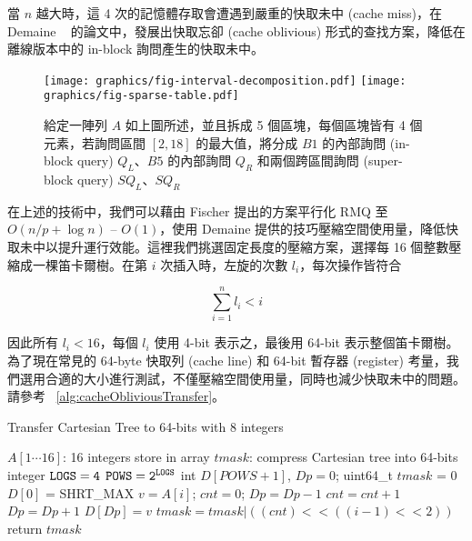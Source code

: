 \documentclass{gapd}
\begin{document}
當 $n$ 越大時，這 4 次的記憶體存取會遭遇到嚴重的快取未中 (cache miss)，在 Demaine ~\cite{demaine} 的論文中，發展出快取忘卻 (cache oblivious) 形式的查找方案，降低在離線版本中的 in-block 詢問產生的快取未中。

\begin{figure*}
  \centering
  \texttt{[image: graphics/fig-interval-decomposition.pdf]}
  \texttt{[image: graphics/fig-sparse-table.pdf]}
  \caption{給定一陣列 $A$ 如上圖所述，並且拆成 5 個區塊，每個區塊皆有 4 個元素，若詢問區間 $[2, 18]$ 的最大值，將分成 $B1$ 的內部詢問 (in-block query) $Q_L$、$B5$ 的內部詢問 $Q_R$ 和兩個跨區間詢問 (super-block query) $SQ_L$、$SQ_R$}
  \label{fig:interval-decomposition}
\end{figure*}

在上述的技術中，我們可以藉由 Fischer 提出的方案平行化 RMQ 至 $O(n / p + \log n)$ -- $O(1)$，使用 Demaine 提供的技巧壓縮空間使用量，降低快取未中以提升運行效能。這裡我們挑選固定長度的壓縮方案，選擇每 16 個整數壓縮成一棵笛卡爾樹。在第 $i$ 次插入時，左旋的次數 $l_i$，每次操作皆符合 

$$\sum_{i=1}^{n} l_i < i$$

因此所有 $l_i < 16$，每個 $l_i$ 使用 4-bit 表示之，最後用 64-bit 表示整個笛卡爾樹。為了現在常見的 64-byte 快取列 (cache line) 和 64-bit 暫存器 (register) 考量，我們選用合適的大小進行測試，不僅壓縮空間使用量，同時也減少快取未中的問題。請參考 ~\ref{alg:cacheObliviousTransfer}。

\begin{algorithm*}
  \caption{Transfer Cartesian Tree to 64-bits with 8 integers}
  \label{alg:cacheObliviousTransfer}
  \begin{algorithmic}[1]
    \Require
      $A[1 \cdots 16]$: 16 integers store in array
    \Ensure 
      $\textit{tmask}$: compress Cartesian tree into 64-bits integer
      \State $\tt{LOGS} = 4$
      \State $\tt{POWS} = 2^{\tt{LOGS}}$
      \State int $D[POWS+1]$, $Dp = 0$;
      \State uint64\_t $tmask$ = $0$
      \State $D[0]$ = SHRT\_MAX
        \State $v = A[i]$;
        \State $cnt = 0$;
          \State $Dp = Dp-1$
          \State $cnt = cnt + 1$
        \EndWhile
        \State $Dp = Dp+1$
        \State $D[Dp] = v$
        \State $tmask = tmask | ((cnt)<<((i-1)<<2))$
      \EndFor
      \State return $tmask$
  \end{algorithmic}
\end{algorithm*}
\end{document}
